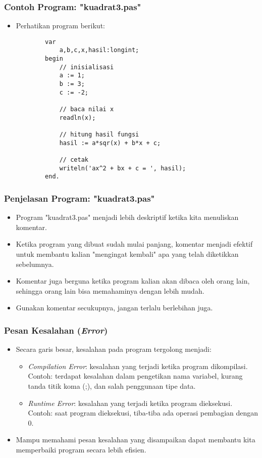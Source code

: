 \documentclass{beamer}
\begin{document}
\begin{frame} [fragile]
\frametitle{Contoh Program: "kuadrat3.pas"}
\begin{itemize}
	\item Perhatikan program berikut:
	\begin{lstlisting}
		var
		    a,b,c,x,hasil:longint;
		begin
		    // inisialisasi
		    a := 1;
		    b := 3;
		    c := -2;
		    
		    // baca nilai x
		    readln(x);
		
		    // hitung hasil fungsi
		    hasil := a*sqr(x) + b*x + c;
		
		    // cetak
		    writeln('ax^2 + bx + c = ', hasil);
		end.
	\end{lstlisting}
\end{itemize}
\end{frame}

\begin{frame}
\frametitle{Penjelasan Program: "kuadrat3.pas"}
\begin{itemize}
	\item Program "kuadrat3.pas" menjadi lebih deskriptif ketika kita menuliskan komentar.
	\item Ketika program yang dibuat sudah mulai panjang, komentar menjadi efektif untuk membantu kalian "mengingat kembali" apa yang telah diketikkan sebelumnya.
	\item Komentar juga berguna ketika program kalian akan dibaca oleh orang lain, sehingga orang lain bisa memahaminya dengan lebih mudah.
	\item Gunakan komentar secukupnya, jangan terlalu berlebihan juga.
\end{itemize}
\end{frame}

\begin{frame}
\frametitle{Pesan Kesalahan (\textit{Error})}
\begin{itemize}
	\item Secara garis besar, kesalahan pada program tergolong menjadi:
	\begin{itemize}
		\item \alert{\textit{Compilation Error}}: kesalahan yang terjadi ketika program dikompilasi.\newline
		Contoh: terdapat kesalahan dalam pengetikan nama variabel, kurang tanda titik koma (;), dan salah penggunaan tipe data.
		\item \alert{\textit{Runtime Error}}: kesalahan yang terjadi ketika program dieksekusi.\newline
		Contoh: saat program dieksekusi, tiba-tiba ada operasi pembagian dengan 0.
	\end{itemize}
	\item Mampu memahami pesan kesalahan yang disampaikan dapat membantu kita memperbaiki program secara lebih efisien.
\end{itemize}
\end{frame}
\end{document}
